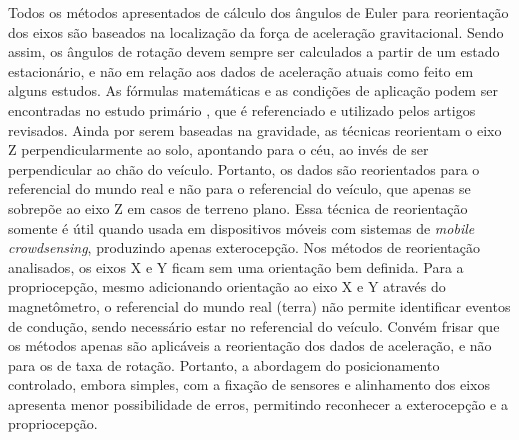 Todos os métodos apresentados de cálculo dos ângulos de Euler para reorientação dos eixos são baseados na localização da força de aceleração gravitacional. Sendo assim, os ângulos de rotação devem sempre ser calculados a partir de um estado estacionário, e não em relação aos dados de aceleração atuais como feito em alguns estudos. As fórmulas matemáticas e as condições de aplicação podem ser encontradas no estudo primário \cite{Astarita2012}, que é referenciado e utilizado pelos artigos revisados. Ainda por serem baseadas na gravidade, as técnicas reorientam o eixo Z perpendicularmente ao solo, apontando para o céu, ao invés de ser perpendicular ao chão do veículo. Portanto, os dados são reorientados para o referencial do mundo real e não para o referencial do veículo, que apenas se sobrepõe ao eixo Z em casos de terreno plano. Essa técnica de reorientação somente é útil quando usada em dispositivos móveis com sistemas de \textit{mobile crowdsensing}, produzindo apenas exterocepção. Nos métodos de reorientação analisados, os eixos X e Y ficam sem uma orientação bem definida. Para a propriocepção, mesmo adicionando orientação ao eixo X e Y através do magnetômetro, o referencial do mundo real (terra) não permite identificar eventos de condução, sendo necessário estar no referencial do veículo. Convém frisar que os métodos apenas são aplicáveis a reorientação dos dados de aceleração, e não para os de taxa de rotação. Portanto, a abordagem do posicionamento controlado, embora simples, com a fixação de sensores e alinhamento dos eixos apresenta menor possibilidade de erros, permitindo reconhecer a exterocepção e a propriocepção.

